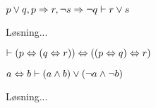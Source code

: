 \begin{opg}
    $p \lor q, p \Rightarrow r, \lnot s \Rightarrow \lnot q \vdash r \lor s$
	\begin{solution}
		Løsning...
	\end{solution}
\end{opg}

\begin{opg}
    $\vdash (p \Leftrightarrow (q \Leftrightarrow r)) \Leftrightarrow ((p \Leftrightarrow q) \Leftrightarrow r)$
\end{opg}

\begin{opg}
    $a \Leftrightarrow b \vdash (a \land b) \lor (\lnot a \land \lnot b)$
	\begin{solution}
		Løsning...
	\end{solution}
\end{opg}

\ifdefined\startOpgaverUdsagnslogik\fi
